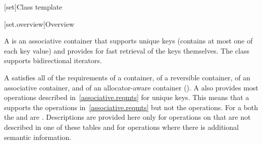 [set]{Class template }

[set.overview]{Overview}

\pnum
{}%
A
is an associative container that supports unique keys (contains at most one of each key value) and
provides for fast retrieval of the keys themselves.
The
 class
supports bidirectional iterators.

\pnum
A  satisfies all of the requirements of a container, of a reversible
container, of an associative
container, and of an allocator-aware container
().
A
also provides most operations described in~\ref{associative.reqmts}
for unique keys.
This means that a
supports the
operations in~\ref{associative.reqmts}
but not the
operations.
For a
both the
and
are
.
Descriptions are provided here only for operations on
that are not described in one of these tables
and for operations where there is additional semantic information.


